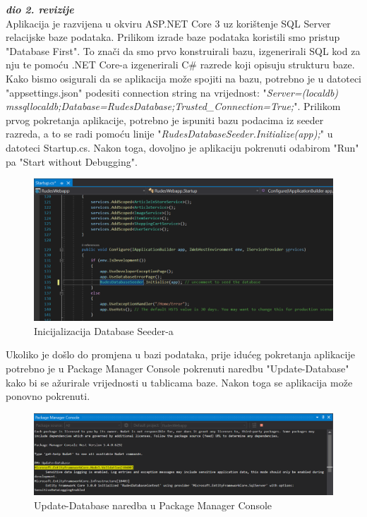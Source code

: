 			\textbf{\textit{dio 2. revizije}}\\
			 
			 \textnormal{Aplikacija je razvijena u okviru ASP.NET Core 3 uz korištenje SQL Server relacijske baze podataka. Prilikom izrade baze podataka koristili smo pristup "Database First". To znači da smo prvo konstruirali bazu, izgenerirali SQL kod za nju te pomoću .NET Core-a izgenerirali C\# razrede koji opisuju strukturu baze. Kako bismo osigurali da se aplikacija može spojiti na bazu, potrebno je u datoteci "appsettings.json" podesiti connection string na vrijednost: "\textit{Server=(localdb)\\mssqllocaldb;Database=RudesDatabase;Trusted\_Connection=True;}". Prilikom prvog pokretanja aplikacije, potrebno je ispuniti bazu podacima iz seeder razreda, a to se radi pomoću linije "\textit{RudesDatabaseSeeder.Initialize(app);}" u datoteci Startup.cs. Nakon toga, dovoljno je aplikaciju pokrenuti odabirom "Run" pa "Start without Debugging".}
			 
			 \begin{figure}[H]
			 	\includegraphics[width=\linewidth]{deployment/database_seeder.png}
			 	\centering
			 	\caption{Inicijalizacija Database Seeder-a}
			 	\label{fig:ClassDiagram1}
			 \end{figure}
			 
			 \textnormal{Ukoliko je došlo do promjena u bazi podataka, prije idućeg pokretanja aplikacije potrebno je u Package Manager Console pokrenuti naredbu "Update-Database" kako bi se ažurirale vrijednosti u tablicama baze. Nakon toga se aplikacija može ponovno pokrenuti.}
			 
			 \begin{figure}[H]
			 	\includegraphics[width=\linewidth]{deployment/pmc_update_database.png}
			 	\centering
			 	\caption{Update-Database naredba u Package Manager Console}
			 	\label{fig:ClassDiagram1}
			 \end{figure}	
		 
